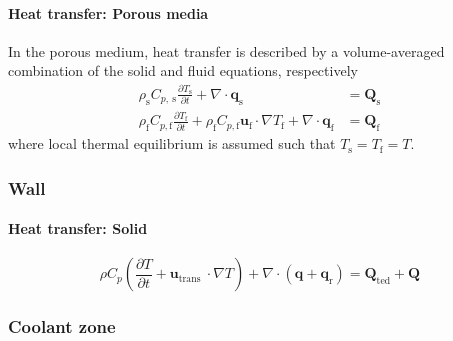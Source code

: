 \paragraph{Heat transfer: Porous media}

In the porous medium, heat transfer is described by a volume-averaged combination of the solid and fluid equations, respectively \cite{comsol_heat_2020}
\begin{align}
    \rho_{\mathrm{s}} C_{p, \mathrm{~s}} \frac{\partial T_{\mathrm{s}}}{\partial t}+\nabla \cdot \mathbf{q}_{\mathrm{s}} &= \mathbf{Q}_{\mathrm{s}} \\
    \rho_{\mathrm{f}} C_{p, \mathrm{f}} \frac{\partial T_{\mathrm{f}}}{\partial t}+\rho_{\mathrm{f}} C_{p, \mathrm{f}} \mathbf{u}_{\mathrm{f}} \cdot \nabla T_{\mathrm{f}}+\nabla \cdot \mathbf{q}_{\mathrm{f}} &= \mathbf{Q}_{\mathrm{f}}
\end{align}
where local thermal equilibrium is assumed such that $T_{\mathrm{s}} = T_{\mathrm{f}} = T$.

\subsubsection{Wall}

\paragraph{Heat transfer: Solid}
\cite{comsol_heat_2020}
\begin{equation}
    \rho C_{p}\left(\frac{\partial T}{\partial t}+\mathbf{u}_{\text {trans }} \cdot \nabla T\right)+\nabla \cdot\left(\mathbf{q}+\mathbf{q}_{\mathrm{r}}\right)= \mathbf{Q}_{\mathrm{ted}}+ \mathbf{Q}
\end{equation}

\subsubsection{Coolant zone}

